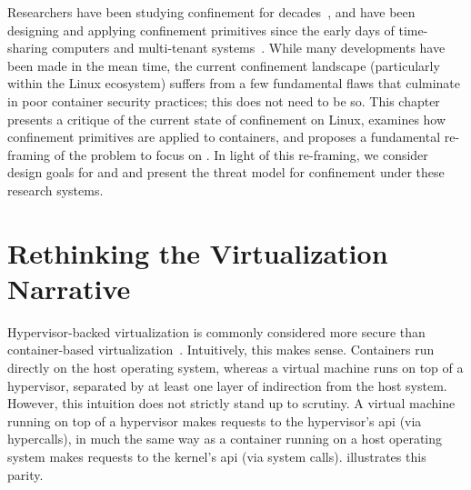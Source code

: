 Researchers have been studying confinement for decades~\cite{lampson1973_confinement}, and
have been designing and applying confinement primitives since the early days of
time-sharing computers and multi-tenant systems~\cite{shu2016_security_isolation_study}.
While many developments have been made in the mean time, the current confinement
landscape (particularly within the Linux ecosystem) suffers from a few fundamental flaws
that culminate in poor container security practices; this does not need to be so. This
chapter presents a critique of the current state of confinement on Linux, examines how
confinement primitives are applied to containers, and proposes a fundamental re-framing of
the problem to focus on . In light of this re-framing, we
consider design goals for \bpfbox{} and \bpfcontain{} and present the threat model for
confinement under these research systems.

\section{Rethinking the Virtualization Narrative}%
\label{s:cp-rethinking}

Hypervisor-backed virtualization is commonly considered more secure than
con\-tain\-er-based virtualization~\cite{sultan2019_container_security,
eder2016_hypervisor_container}.  Intuitively, this makes sense. Containers run directly on
the host operating system, whereas a virtual machine runs on top of a hypervisor,
separated by at least one layer of indirection from the host system. However, this
intuition does not strictly stand up to scrutiny. A virtual machine running on top of
a hypervisor makes requests to the hypervisor's \gls{api} (via hypercalls), in much the
same way as a container running on a host operating system makes requests to the kernel's
\gls{api} (via system calls).   illustrates this parity.


